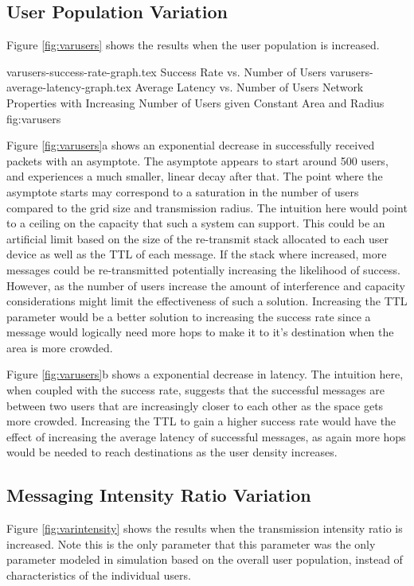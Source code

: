 \subsection{User Population Variation}
Figure \ref{fig:varusers} shows the results when the user population is increased.

\sidebysidefigures
{varusers-success-rate-graph.tex}      {Success Rate vs. Number of Users}
{varusers-average-latency-graph.tex}   {Average Latency vs. Number of Users}
{Network Properties with Increasing Number of Users given Constant Area and Radius}
{fig:varusers}

Figure \ref{fig:varusers}a shows an exponential decrease in successfully received packets with
an asymptote. The asymptote appears to start around 500 users, and experiences a much smaller,
linear decay after that. The point where the asymptote starts may correspond to a saturation in the
number of users compared to the grid size and transmission radius. The intuition here would point to
a ceiling on the capacity that such a system can support. This could be an artificial limit based
on the size of the re-transmit stack allocated to each user device as well as the TTL of each message.
If the stack where increased, more messages could be re-transmitted potentially increasing the
likelihood of success. However, as the number of users increase the amount of interference and
capacity considerations might limit the effectiveness of such a solution. Increasing the TTL
parameter would be a better solution to increasing the success rate since a message would
logically need more hops to make it to it's destination when the area is more crowded.

Figure \ref{fig:varusers}b shows a exponential decrease in latency. The intuition here, when coupled
with the success rate, suggests that the successful messages are between two users that are 
increasingly closer to each other as the space gets more crowded. Increasing the TTL to gain a higher
success rate would have the effect of increasing the average latency of successful messages, as
again more hops would be needed to reach destinations as the user density increases.

\subsection{Messaging Intensity Ratio Variation}
Figure \ref{fig:varintensity} shows the results when the transmission intensity ratio is increased.
Note this is the only parameter that this parameter was the only parameter modeled in simulation
based on the overall user population, instead of characteristics of the individual users.

